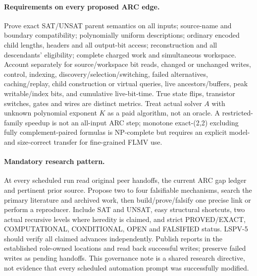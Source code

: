 \documentclass[11pt]{article}
\begin{document}
\paragraph{Requirements on every proposed ARC edge.}
Prove exact SAT/UNSAT parent semantics on all inputs; source-name and boundary compatibility; polynomially uniform descriptions; ordinary encoded child lengths, headers and all output-bit access; reconstruction and all descendants' eligibility; complete charged work and simultaneous workspace. Account separately for source/workspace bit reads, changed or unchanged writes, control, indexing, discovery/selection/switching, failed alternatives, caching/replay, child construction or virtual queries, live ancestors/buffers, peak writable/index bits, and cumulative live-bit-time. True state flips, transistor switches, gates and wires are distinct metrics. Treat actual solver $A$ with unknown polynomial exponent $K$ as a paid algorithm, not an oracle. A restricted-family speedup is not an all-input ARC step; monotone exact-(2,2) excluding fully complement-paired formulas is NP-complete but requires an explicit model- and size-correct transfer for fine-grained FLMV use.

\paragraph{Mandatory research pattern.}
At every scheduled run read original peer handoffs, the current ARC gap ledger and pertinent prior source. Propose two to four falsifiable mechanisms, search the primary literature and archived work, then build/prove/falsify one precise link or perform a reproducer. Include SAT and UNSAT, easy structural shortcuts, two actual recursive levels where heredity is claimed, and strict PROVED/EXACT, COMPUTATIONAL, CONDITIONAL, OPEN and FALSIFIED status. LSPV-5 should verify all claimed advances independently. Publish reports in the established role-owned locations and read back successful writes; preserve failed writes as pending handoffs. This governance note is a shared research directive, not evidence that every scheduled automation prompt was successfully modified.
\end{document}
